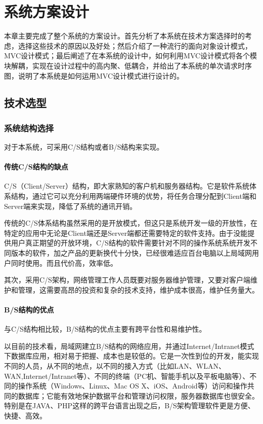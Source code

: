 
\chapter{系统方案设计}
本章主要完成了整个系统的方案设计。首先分析了本系统在技术方案选择时的考虑，选择这些技术的原因以及好处；然后介绍了一种流行的面向对象设计模式，MVC设计模式；最后阐述了在本系统的设计中，如何利用MVC设计模式将各个模块解耦，实现在设计过程中的高内聚、低耦合，并给出了本系统的单次请求时序图，说明了本系统是如何运用MVC设计模式进行设计的。

\section{技术选型}
\subsection{系统结构选择}
对于本系统，可采用C/S结构或者B/S结构来实现。
\subsubsection{传统C/S结构的缺点}
C/S（Client/Server）结构，即大家熟知的客户机和服务器结构。它是软件系统体系结构，通过它可以充分利用两端硬件环境的优势，将任务合理分配到Client端和Server端来实现，降低了系统的通讯开销。

传统的C/S体系结构虽然采用的是开放模式，但这只是系统开发一级的开放性，在特定的应用中无论是Client端还是Server端都还需要特定的软件支持。由于没能提供用户真正期望的开放环境，C/S结构的软件需要针对不同的操作系统系统开发不同版本的软件，加之产品的更新换代十分快，已经很难适应百台电脑以上局域网用户同时使用。而且代价高，效率低。

其次，采用C/S架构，网络管理工作人员既要对服务器维护管理，又要对客户端维护和管理，这需要高昂的投资和复杂的技术支持，维护成本很高，维护任务量大。

\subsubsection{B/S结构的优点}
与C/S结构相比较，B/S结构的优点主要有跨平台性和易维护性。

以目前的技术看，局域网建立B/S结构的网络应用，并通过Internet/Intranet模式下数据库应用，相对易于把握、成本也是较低的。它是一次性到位的开发，能实现不同的人员，从不同的地点，以不同的接入方式（比如LAN、WLAN、WAN,Internet/Intranet等）、不同的终端（PC机、智能手机以及平板电脑等）、不同的操作系统（Windows、Linux、Mac OS X、iOS、Android等）访问和操作共同的数据库；它能有效地保护数据平台和管理访问权限，服务器数据库也很安全。特别是在JAVA、PHP这样的跨平台语言出现之后，B/S架构管理软件更是方便、快捷、高效。


